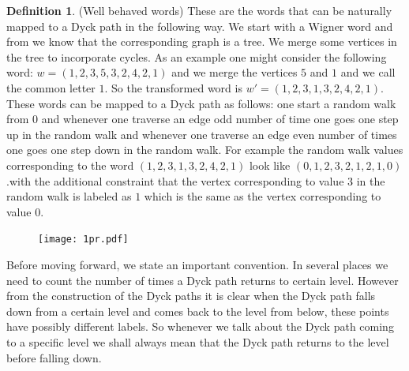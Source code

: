\documentclass[12pt]{article}
\numberwithin{equation}{section}
\numberwithin{equation}{section}
\theoremstyle{definition}
\newtheorem{definition}{Definition}[section]
\renewcommand{\1}{\bf 1}
\begin{document}
 \begin{definition}(Well behaved words)
These are the words that can be naturally mapped to a Dyck path in the following way. We start with a Wigner word and from \citet{AGZ} we know that the corresponding graph is a tree. We merge some vertices in the tree to incorporate cycles. As an example one might consider the following word: $w=(1,2,3,5,3,2,4,2,1)$ and we merge the vertices $5$ and $1$ and we call the common letter $1$. So the transformed word is $w'=(1,2,3,1,3,2,4,2,1)$. These words can be mapped to a Dyck path as follows: one start a random walk from $0$ and whenever one traverse an edge odd number of time one goes one step up in the random walk and whenever one traverse an edge even number of times one goes one step down in the random walk. For example the random walk values corresponding to the word $(1,2,3,1,3,2,4,2,1)$ look like $(0,1,2,3,2,1,2,1,0)$.with the additional constraint that the vertex corresponding to value $3$ in the random walk is labeled as $1$ which is the same as the vertex corresponding to value $0$.  
\begin{figure}[H]
        \begin{center}
                \texttt{[image: 1pr.pdf]}
        ~ %
      \end{center}   
 \end{figure} 
\end{definition}
Before moving forward, we state an important convention. In several places we need to count the number of times a Dyck path returns to certain level. However from the construction of the Dyck paths it is clear when the Dyck path falls down from a certain level and comes back to the level from below, these points have possibly different labels. So whenever we talk about the Dyck path coming to a specific level we shall always mean that the Dyck path returns to the level before falling down. 
\end{document}
